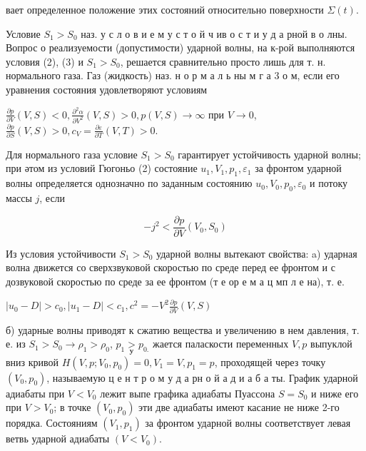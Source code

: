 \documentclass[10pt]{article}
\begin{document}
вает определенное положение этих состояний относительно поверхности $\Sigma(t)$.



Условие $S_{1}>S_{0}$ наз. у с л о в и е м у с т о й ч ив о с т и у д а рной в о лны. Вопрос о реализуемости (допустимости) ударной волны, на к-рой выполняются условия (2), (3) и $S_{1}>S_{0}$, решается сравнительно просто лишь для т. н. нормального газа. Газ (жидкость) наз. н о р м а л ь ны м г а 3 о м, если его уравнения состояния удовлетворяют условиям



$\frac{\partial p}{\partial V}(V, S)<0, \frac{\partial^{2} \alpha}{\partial V^{2}}(V, S)>0, p(V, S) \rightarrow \infty$ при $V \longrightarrow 0$, $\frac{\partial p}{\partial S}(V, S)>0, c_{V}=\frac{\partial \varepsilon}{\partial T}(V, T)>0$.



Для нормального газа условие $S_{1}>S_{0}$ гарантирует устойчивость ударной волны; при әтом из условий Гюгоньо (2) состояние $u_{1}, V_{1}, p_{1}, \varepsilon_{1}$ за фронтом ударной волны определяется однозначно по заданным состоянию $u_{0}, V_{0}, p_{0}, \varepsilon_{0}$ и потоку массы $j$, если



\[

-j^{2}<\frac{\partial p}{\partial V}\left(V_{0}, S_{0}\right)

\]



Из условия устойчивости $S_{1}>S_{0}$ ударной волны вытекают свойства: a) ударная волна движется со сверхзвуковой скоростью по среде перед ее фронтом и с дозвуковой скоростью по среде за ее фронтом (т е ор е м а ц мп л е на), т. е.



$\left|u_{0}-D\right|>c_{0},\left|u_{1}-D\right|<c_{1}, c^{2}=-V^{2} \frac{\partial p}{\partial V}(V, S)$



б) ударные волны приводят к сжатию вещества и увеличению в нем давления, т. е. из $S_{1}>S_{0} \rightarrow \rho_{1}>\rho_{0}$, $p_{1} \underset{\mathbf{y}}{>} p_{0 .}$ жается паласкости переменных $V, p$ выпуклой вниз кривой $H\left(V, p ; V_{0}, p_{0}\right)=0, V_{1}=V, p_{1}=p$, проходящей через точку $\left(V_{0}, p_{0}\right)$, называемую ц е н т р о м у д а рн о й а д и а б а ты. График ударной адиабаты при $V<V_{0}$ лежит выпе графика адиабаты Пуассона $S=S_{0}$ и ниже его при $V>V_{0}$; в точке $\left(V_{0}, p_{0}\right)$ эти две адиабаты имеют касание не ниже 2-го порядка. Состояниям $\left(V_{1}, p_{1}\right)$ за фронтом ударной волны соответствует левая ветвь ударной адиабаты $\left(V<V_{0}\right)$.
\end{document}
